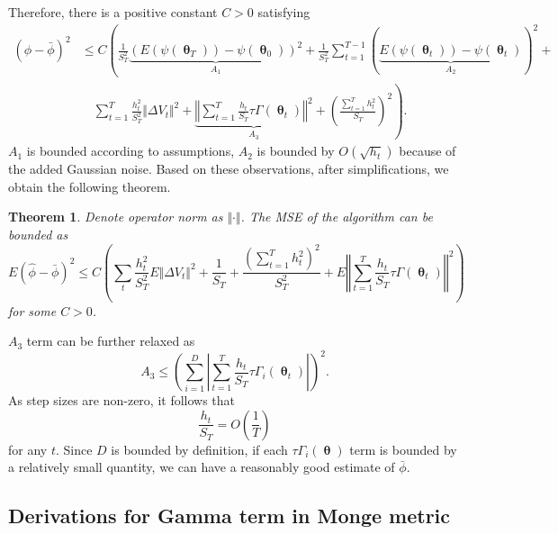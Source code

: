 \documentclass[10pt]{article} %
\DeclareMathOperator{\btheta}{\boldsymbol{\theta}}
\theoremstyle{plain}
\newtheorem{theorem}{Theorem}[section]
\theoremstyle{definition}
\theoremstyle{remark}
\begin{document}
Therefore, there is a positive constant $C>0$ satisfying
\begin{align*}
\left(\hat{\phi}-\bar{\phi}\right)^{2} &\leq C \left( \frac{1}{S^{2}_{T}}\underbrace{(E(\psi(\btheta_{T}))-\psi(\btheta_0))^{2}}_{A_{1}} + \frac{1}{S^{2}_{T}}\sum_{t=1}^{T-1}(\underbrace{E(\psi(\btheta_t))-\psi(\btheta_t)}_{A_2})^{2} + \right .\\
&\left .\quad \sum_{t=1}^{T}\frac{h_{t}^2}{S_{T}^{2}}\Vert\Delta V_{t}\Vert^{2}+\underbrace{\left\Vert \sum_{t=1}^{T}\frac{h_{t}}{S_T}\tau\Gamma(\btheta_t) \right\Vert^{2}}_{A_{3}}+ \left(\frac{\sum_{t=1}^{T}h_{t}^2}{S_{T}}\right)^2 \right).
\end{align*}
$A_1$ is bounded according to assumptions, $A_{2}$ is bounded by $O(\sqrt{h_{t}})$ because of the added Gaussian noise. Based on these observations, after simplifications, we obtain the following theorem.

\begin{theorem}

Denote operator norm as $\Vert\cdot\Vert$. The MSE of the algorithm can be bounded as
\begin{equation*}
E\left(\hat{\phi}-\bar{\phi}\right)^{2} \leq C\left(\sum_{t}\frac{h_{t}^2}{S_{T}^{2}}E\Vert\Delta V_{t}\Vert^{2}+\frac{1}{S_T}+\frac{(\sum_{t=1}^{T}h_{t}^2)^{2}}{S_{T}^2} +E\left\Vert \sum_{t=1}^{T}\frac{h_{t}}{S_T}\tau\Gamma(\btheta_t) \right\Vert^{2}\right)
\end{equation*}
for some $C > 0$.

\end{theorem}

$A_{3}$ term can be further relaxed as
\begin{equation*}
A_3 \leq\left(\sum_{i=1}^{D} \left\vert\sum_{t=1}^{T}\frac{h_t}{S_T}\tau\Gamma_{i}(\btheta_t)\right\vert \right)^{2}.
\end{equation*}
As step sizes are non-zero, it follows that
\begin{equation*}
\frac{h_t}{S_{T}}=O(\frac{1}{T})
\end{equation*}
for any $t$.
Since $D$ is bounded by definition, if each $\tau\Gamma_{i}(\btheta)$ term is bounded by a relatively small quantity, we can have a reasonably good estimate of $\bar{\phi}$.

\subsection{Derivations for Gamma term in Monge metric}
\label{app:proofMonge}
\end{document}
